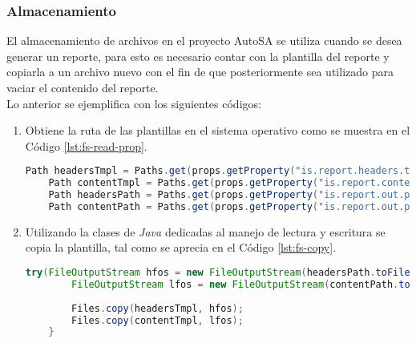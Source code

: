 \subsubsection{Almacenamiento}
El almacenamiento de archivos en el proyecto AutoSA se utiliza cuando se desea generar un reporte, para esto es necesario contar con la plantilla del reporte y copiarla a un archivo nuevo con el fin de que posteriormente sea utilizado para vaciar el contenido del reporte.\\
Lo anterior se ejemplifica con los siguientes códigos:
\begin{enumerate}
	\item Obtiene la ruta de las plantillas en el sistema operativo como se muestra en el Código \ref{lst:fs-read-prop}.
	\begin{lstlisting}[language=Java, caption={Obtención de las rutas de las plantillas.}, captionpos=b, label={lst:fs-read-prop}]
	Path headersTmpl = Paths.get(props.getProperty("is.report.headers.tmpl"));
	Path contentTmpl = Paths.get(props.getProperty("is.report.content.tmpl"));
	Path headersPath = Paths.get(props.getProperty("is.report.out.path"), headersTmpl.getFileName().toString());
	Path contentPath = Paths.get(props.getProperty("is.report.out.path"), contentTmpl.getFileName().toString());
	\end{lstlisting}

	\item Utilizando la clases de \textit{Java} dedicadas al manejo de lectura y escritura se copia la plantilla, tal como se aprecia en el Código \ref{lst:fs-copy}.

\pagebreak
	
	\begin{lstlisting}[language=Java, caption={Copia de archivos.}, captionpos=b, label={lst:fs-copy}]
	try(FileOutputStream hfos = new FileOutputStream(headersPath.toFile(), false);
		FileOutputStream lfos = new FileOutputStream(contentPath.toFile(), false)){
		
		Files.copy(headersTmpl, hfos);
		Files.copy(contentTmpl, lfos);
	}
	\end{lstlisting}
\end{enumerate}
